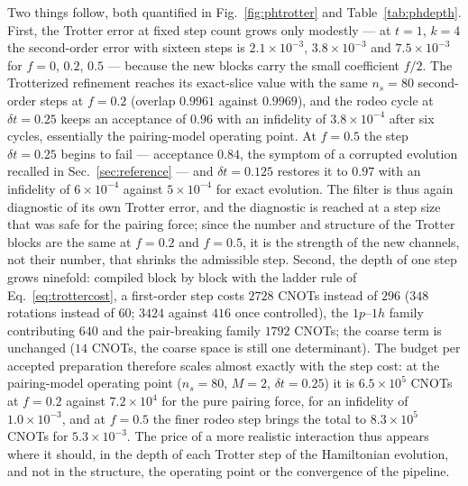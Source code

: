 \documentclass[
  aps,            %
  prc,            %
  reprint,        %
  superscriptaddress,
  floatfix,
  nofootinbib
]{revtex4-2}
\begin{document}
Two things follow, both quantified in Fig.~\ref{fig:phtrotter} and
Table~\ref{tab:phdepth}.  First, the Trotter error at fixed step count grows
only modestly --- at $t=1$, $k=4$ the second-order error with sixteen steps is
$2.1\times10^{-3}$, $3.8\times10^{-3}$ and $7.5\times10^{-3}$ for $f=0$,
$0.2$, $0.5$ --- because the new blocks carry the small coefficient $f/2$.
The Trotterized refinement reaches its exact-slice value with the same
$n_s=80$ second-order steps at $f=0.2$ (overlap $0.9961$ against $0.9969$),
and the rodeo cycle at $\delta t=0.25$ keeps an acceptance of $0.96$ with an
infidelity of $3.8\times10^{-4}$ after six cycles, essentially the
pairing-model operating point.  At $f=0.5$ the step $\delta t=0.25$ begins to
fail --- acceptance $0.84$, the symptom of a corrupted evolution recalled in
Sec.~\ref{sec:reference} --- and $\delta t=0.125$ restores it to $0.97$ with
an infidelity of $6\times10^{-4}$ against $5\times10^{-4}$ for exact
evolution.  The filter is thus again diagnostic of its own Trotter error,
and the diagnostic is reached at a step size that was safe for the pairing
force; since the number and structure of the Trotter blocks are the same at
$f=0.2$ and $f=0.5$, it is the strength of the new channels, not their
number, that shrinks the admissible step.  Second, the depth of one step
grows ninefold: compiled block by block with the ladder rule of
Eq.~\eqref{eq:trottercost}, a first-order step costs $2728$ CNOTs instead of
$296$ ($348$ rotations instead of $60$; $3424$ against $416$ once
controlled), the $1p$--$1h$ family contributing $640$ and the pair-breaking
family $1792$ CNOTs; the coarse term is unchanged ($14$ CNOTs, the coarse
space is still one determinant).  The budget per accepted preparation
therefore scales almost exactly with the step cost: at the pairing-model
operating point ($n_s=80$, $M=2$, $\delta t=0.25$) it is $6.5\times10^{5}$
CNOTs at $f=0.2$ against $7.2\times10^{4}$ for the pure pairing force, for an
infidelity of $1.0\times10^{-3}$, and at $f=0.5$ the finer rodeo step brings
the total to $8.3\times10^{5}$ CNOTs for $5.3\times10^{-3}$.  The price of a
more realistic interaction thus appears where it should, in the depth of
each Trotter step of the Hamiltonian evolution, and not in the structure,
the operating point or the convergence of the pipeline.
\end{document}
